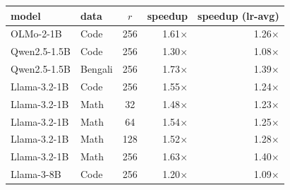 \begin{tabular}{l l c r r}
\toprule
model & data & $r$ & speedup & speedup (lr-avg) \\
\midrule
OLMo-2-1B & Code & 256 & 1.61$\times$ & 1.26$\times$ \\
\addlinespace
Qwen2.5-1.5B & Code & 256 & 1.30$\times$ & 1.08$\times$ \\
Qwen2.5-1.5B & Bengali & 256 & 1.73$\times$ & 1.39$\times$ \\
\addlinespace
Llama-3.2-1B & Code & 256 & 1.55$\times$ & 1.24$\times$ \\
Llama-3.2-1B & Math & 32 & 1.48$\times$ & 1.23$\times$ \\
Llama-3.2-1B & Math & 64 & 1.54$\times$ & 1.25$\times$ \\
Llama-3.2-1B & Math & 128 & 1.52$\times$ & 1.28$\times$ \\
Llama-3.2-1B & Math & 256 & 1.63$\times$ & 1.40$\times$ \\
\addlinespace
Llama-3-8B & Code & 256 & 1.20$\times$ & 1.09$\times$ \\
\bottomrule
\end{tabular}
